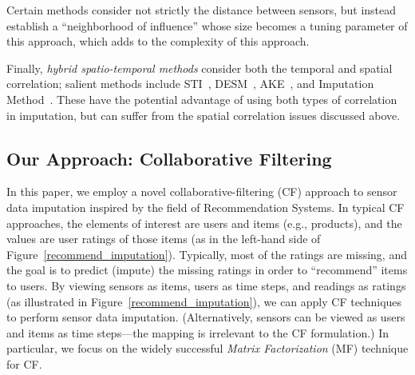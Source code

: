 Certain methods consider not strictly the distance between sensors,
but instead establish a ``neighborhood of influence'' whose size
becomes a tuning parameter of this approach, which adds to the
complexity of this approach.

Finally, {\em hybrid spatio-temporal methods} consider both the
temporal and spatial correlation; salient methods include
STI~\cite{Jian-Zhong:STI}, DESM~\cite{li2008data}, 
AKE~\cite{pan2010k}, and Imputation Method~\cite{Lim:robust}.  These
have the potential advantage of using both types of correlation in
imputation, but can suffer from the spatial correlation issues
discussed above.




\subsection{Our Approach: Collaborative Filtering}

In this paper, we employ a novel collaborative-filtering (CF) approach
to sensor data imputation inspired by the field of Recommendation
Systems.  In typical CF approaches, the elements of interest are users
and items (e.g., products), and the values are user ratings of those
items (as in the left-hand side of
Figure~\ref{recommend_imputation}).  Typically, most of the ratings
are missing, and the goal is to predict (impute) the missing ratings
in order to ``recommend'' items to users.  By viewing sensors as
items, users as time steps, and readings as ratings (as illustrated in
Figure~\ref{recommend_imputation}), we can apply CF
techniques to perform sensor data imputation. (Alternatively, sensors
can be viewed as users and items as time steps---the mapping is
irrelevant to the CF formulation.)  In particular, we focus on the
widely successful {\em Matrix Factorization} (MF) technique for CF.

